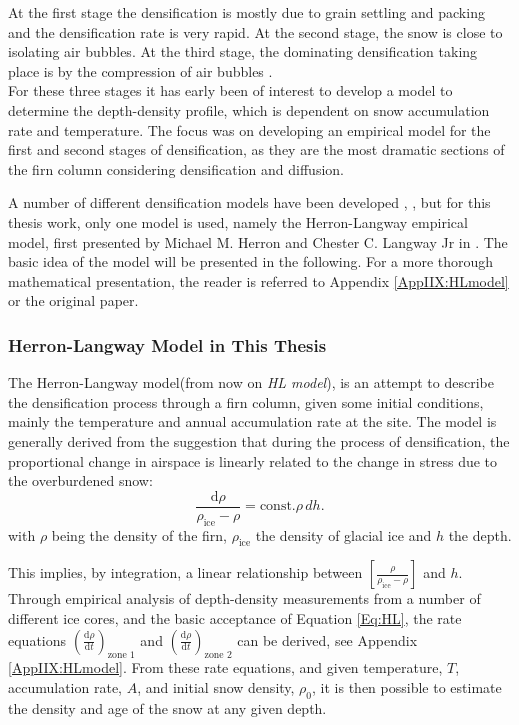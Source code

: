 \documentclass[../../CompleteThesis2/Complete_2ndDraft]{subfiles}
\begin{document}
At the first stage the densification is mostly due to grain settling and packing and the densification rate is very rapid. At the second stage, the snow is close to isolating air bubbles. At the third stage, the dominating densification taking place is by the compression of air bubbles \cite{HerronLangway1980}.\\
For these three stages it has early been of interest to develop a model to determine the depth-density profile, which is dependent on snow accumulation rate and temperature. The focus was on developing an empirical model for the first and second stages of densification, as they are the most dramatic sections of the firn column considering densification and diffusion.

A number of different densification models have been developed \cite[J. Barnola, 1991]{Barnola1991}, \cite[C. Goujon, 2003]{Goujon2003},  but for this thesis work, only one model is used, namely the Herron-Langway empirical model, first presented by Michael M. Herron and Chester C. Langway Jr in \cite[Herron and Langway, 1980]{HerronLangway1980}. The basic idea of the model will be presented in the following. For a more thorough mathematical presentation, the reader is referred to Appendix \ref{AppIIX:HLmodel} or the original paper.

\subsubsection[HL in This Thesis]{Herron-Langway Model in This Thesis}
\label{Subsubsec:Ice_DiffusionAndDensification_Densification_HLmodel}
The Herron-Langway model(from now on \textit{HL model}), is an attempt to describe the densification process through a firn column, given some initial conditions, mainly the temperature and annual accumulation rate at the site. The model is generally derived from the suggestion that during the process of densification, the proportional change in airspace is linearly related to the change in stress due to the overburdened snow:
\begin{equation}
	\frac{\text{d}\rho}{\rho_{\text{ice}} - \rho} = \text{const.} \rho \, dh.
	\label{Eq:HL}
\end{equation}
with $\rho$ being the density of the firn, $\rho_{\text{ice}}$ the density of glacial ice and $h$ the depth.

This implies, by integration, a linear relationship between $\left[\frac{\rho}{\rho_{\text{ice}} - \rho}\right]$ and $h$. Through empirical analysis of depth-density measurements from a number of different ice cores, and the basic acceptance of Equation \ref{Eq:HL}, the rate equations $\left(\frac{\text{d}\rho}{\text{d}t}\right)_{\text{zone 1}}$ and $\left(\frac{\text{d}\rho}{\text{d}t}\right)_{\text{zone 2}}$ can be derived, see Appendix \ref{AppIIX:HLmodel}. From these rate equations, and given temperature, $T$, accumulation rate, $A$, and initial snow density, $\rho_0$, it is then possible to estimate the density and age of the snow at any given depth. 
\end{document}
